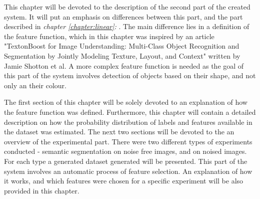 This chapter will be devoted to the description of the second part of the created system. It will put an emphasis on differences between this part, and the part described in \textit{chapter \ref{chapter:linear}: }. The main difference lies in a definition of the feature function, which in this chapter was inspired by an article "TextonBoost for Image Understanding:
Multi-Class Object Recognition and Segmentation by
Jointly Modeling Texture, Layout, and Context" \cite{article_main} written by Jamie Shotton et al. A more complex feature function is needed as the goal of this part of the system involves detection of objects based on their shape, and not only an their colour.

The first section of this chapter will be solely devoted to an explanation of how the feature function was defined. Furthermore, this chapter will contain a detailed description on how the probability distribution of labels and features available in the dataset was estimated. The next two sections will be devoted to the an overview of the experimental part. There were two different types of experiments conducted - semantic segmentation on noise free images, and on noised images. For each type a generated dataset generated will be presented. This part of the system involves an automatic process of feature selection. An explanation of how it works, and which features were chosen for a specific experiment will be also provided in this chapter.  